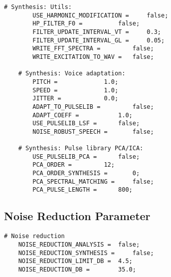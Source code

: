 \begin{lstlisting}[caption = Configuration file]
	# Synthesis: Utils:
		USE_HARMONIC_MODIFICATION = 	false;
		HP_FILTER_F0 = 			false;
		FILTER_UPDATE_INTERVAL_VT = 	0.3;
		FILTER_UPDATE_INTERVAL_GL = 	0.05;
		WRITE_FFT_SPECTRA = 		false;
		WRITE_EXCITATION_TO_WAV = 	false;

	# Synthesis: Voice adaptation:
		PITCH = 			1.0;
		SPEED = 			1.0;
		JITTER = 			0.0;
		ADAPT_TO_PULSELIB = 		false;
		ADAPT_COEFF = 			1.0;
		USE_PULSELIB_LSF = 		false;
		NOISE_ROBUST_SPEECH = 		false;

	# Synthesis: Pulse library PCA/ICA:
		USE_PULSELIB_PCA =		false;
		PCA_ORDER =			12;
		PCA_ORDER_SYNTHESIS =		0;
		PCA_SPECTRAL_MATCHING = 	false;
		PCA_PULSE_LENGTH = 		800;
\end{lstlisting}

\subsection{Noise Reduction Parameter}
\label{glott_conf_noise_red}

\begin{lstlisting}[caption = Noise reduction parameters in GlottHMM's configuration file]
# Noise reduction
	NOISE_REDUCTION_ANALYSIS = 	false;
	NOISE_REDUCTION_SYNTHESIS = 	false;
	NOISE_REDUCTION_LIMIT_DB = 	4.5;
	NOISE_REDUCTION_DB = 		35.0;
\end{lstlisting}